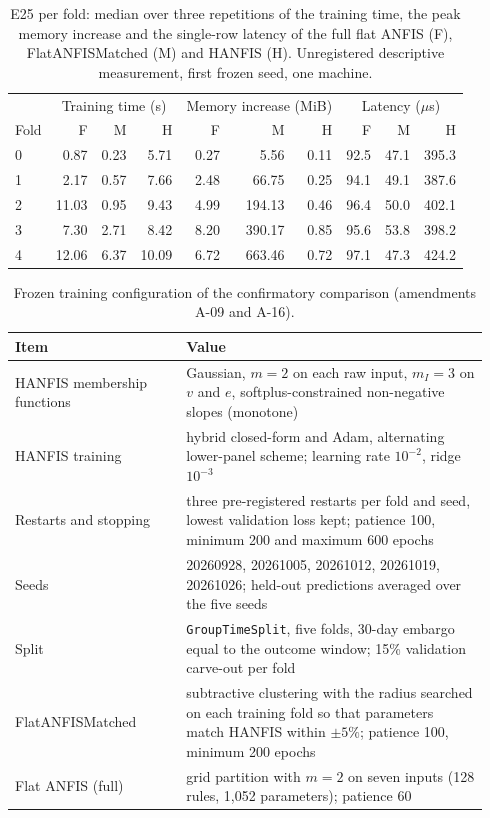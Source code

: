 \documentclass[pdflatex,sn-basic]{sn-jnl}
\theoremstyle{thmstyleone}%
\theoremstyle{thmstyletwo}%
\theoremstyle{thmstylethree}%
\begin{document}
\begin{table}[ht]
\caption{E25 per fold: median over three repetitions of the training time, the peak memory increase and the single-row latency of the full flat ANFIS (F), FlatANFISMatched (M) and HANFIS (H). Unregistered descriptive measurement, first frozen seed, one machine.}
\footnotesize
\setlength{\tabcolsep}{3pt}
\begin{tabular}{@{}lrrrrrrrrr@{}}
\hline
 & \multicolumn{3}{c}{Training time (s)} & \multicolumn{3}{c}{Memory increase (MiB)} & \multicolumn{3}{c}{Latency ($\mu$s)}\\
Fold & F & M & H & F & M & H & F & M & H\\
\hline
0 & 0.87 & 0.23 & 5.71 & 0.27 & 5.56 & 0.11 & 92.5 & 47.1 & 395.3\\
1 & 2.17 & 0.57 & 7.66 & 2.48 & 66.75 & 0.25 & 94.1 & 49.1 & 387.6\\
2 & 11.03 & 0.95 & 9.43 & 4.99 & 194.13 & 0.46 & 96.4 & 50.0 & 402.1\\
3 & 7.30 & 2.71 & 8.42 & 8.20 & 390.17 & 0.85 & 95.6 & 53.8 & 398.2\\
4 & 12.06 & 6.37 & 10.09 & 6.72 & 663.46 & 0.72 & 97.1 & 47.3 & 424.2\\
\hline
\end{tabular}
\end{table}
\begin{table}[ht]
\caption{Frozen training configuration of the confirmatory comparison (amendments A-09 and A-16).}
\footnotesize
\begin{tabular}{@{}p{0.34\linewidth}p{0.60\linewidth}@{}}
\hline
Item & Value\\
\hline
HANFIS membership functions & Gaussian, $m=2$ on each raw input, $m_I=3$ on $v$ and $e$, softplus-constrained non-negative slopes (monotone)\\
HANFIS training & hybrid closed-form and Adam, alternating lower-panel scheme; learning rate $10^{-2}$, ridge $10^{-3}$\\
Restarts and stopping & three pre-registered restarts per fold and seed, lowest validation loss kept; patience 100, minimum 200 and maximum 600 epochs\\
Seeds & 20260928, 20261005, 20261012, 20261019, 20261026; held-out predictions averaged over the five seeds\\
Split & \texttt{GroupTimeSplit}, five folds, 30-day embargo equal to the outcome window; 15\% validation carve-out per fold\\
FlatANFISMatched & subtractive clustering with the radius searched on each training fold so that parameters match HANFIS within $\pm 5\%$; patience 100, minimum 200 epochs\\
Flat ANFIS (full) & grid partition with $m=2$ on seven inputs (128 rules, 1{,}052 parameters); patience 60\\
\hline
\end{tabular}
\end{table}
\end{document}
